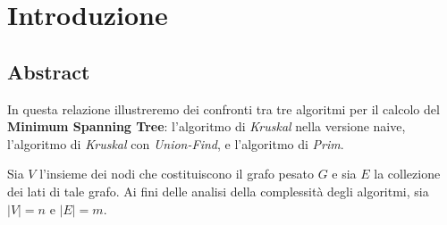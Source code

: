 \section{Introduzione}

\subsection{Abstract}

In questa relazione illustreremo dei confronti tra tre algoritmi per il calcolo del 
\textbf{Minimum Spanning Tree}: l'algoritmo di \textit{Kruskal} nella versione naive, 
l'algoritmo di \textit{Kruskal} con \textit{Union-Find}, e l'algoritmo di \textit{Prim}.

Sia $V$ l'insieme dei nodi che costituiscono il grafo pesato $G$ e sia $E$ la collezione dei lati di tale 
grafo. Ai fini delle analisi della complessità degli algoritmi, sia $|V| = n$ e $|E| = m$.

